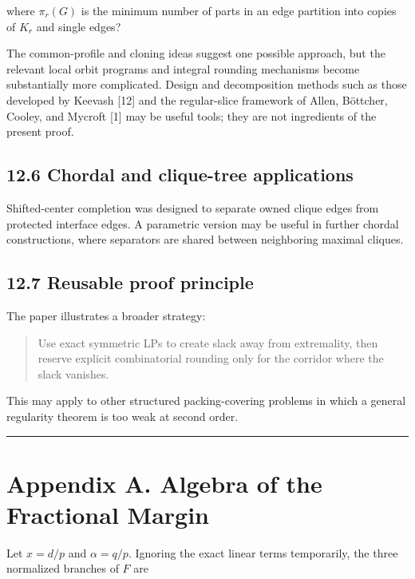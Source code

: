 \documentclass[english,11pt,a4paper]{article}
\begin{document}
where \(\pi_r(G)\) is the minimum number of parts in an edge partition
into copies of \(K_r\) and single edges?

The common-profile and cloning ideas suggest one possible approach, but
the relevant local orbit programs and integral rounding mechanisms
become substantially more complicated. Design and decomposition methods
such as those developed by Keevash {[}12{]} and the regular-slice
framework of Allen, Böttcher, Cooley, and Mycroft {[}1{]} may be useful
tools; they are not ingredients of the present proof.

\subsection{12.6 Chordal and clique-tree
applications}\label{chordal-and-clique-tree-applications}

Shifted-center completion was designed to separate owned clique edges
from protected interface edges. A parametric version may be useful in
further chordal constructions, where separators are shared between
neighboring maximal cliques.

\subsection{12.7 Reusable proof
principle}\label{reusable-proof-principle}

The paper illustrates a broader strategy:

\begin{quote}
Use exact symmetric LPs to create slack away from extremality, then
reserve explicit combinatorial rounding only for the corridor where the
slack vanishes.
\end{quote}

This may apply to other structured packing-covering problems in which a
general regularity theorem is too weak at second order.

\begin{center}\rule{0.5\linewidth}{0.5pt}\end{center}

\section{Appendix A. Algebra of the Fractional
Margin}\label{appendix-a.-algebra-of-the-fractional-margin}

Let \(x=d/p\) and \(\alpha=q/p\). Ignoring the exact linear terms
temporarily, the three normalized branches of \(F\) are
\end{document}
